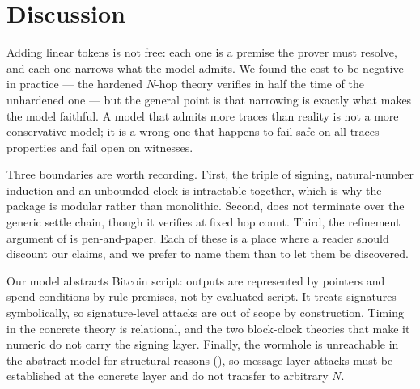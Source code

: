 \section{Discussion}

Adding linear tokens is not free: each one is a premise the prover must
resolve, and each one narrows what the model admits. We found the cost to be
negative in practice --- the hardened $N$-hop theory verifies in half the time
of the unhardened one --- but the general point is that narrowing is exactly
what makes the model faithful. A model that admits more traces than reality is
not a more conservative model; it is a wrong one that happens to fail safe on
all-traces properties and fail open on witnesses.

Three boundaries are worth recording. First, the triple of signing,
natural-number induction and an unbounded clock is intractable together, which
is why the package is modular rather than monolithic. Second,
 does not terminate over the generic
settle chain, though it verifies at fixed hop count. Third, the refinement
argument of  is pen-and-paper. Each of these is a place
where a reader should discount our claims, and we prefer to name them than to
let them be discovered.

Our model abstracts Bitcoin script: outputs are represented by pointers and
spend conditions by rule premises, not by evaluated script. It treats
signatures symbolically, so signature-level attacks are out of scope by
construction. Timing in the concrete theory is relational, and the two
block-clock theories that make it numeric do not carry the signing layer.
Finally, the wormhole is unreachable in the abstract model for structural
reasons (), so message-layer attacks must be established
at the concrete layer and do not transfer to arbitrary $N$.
